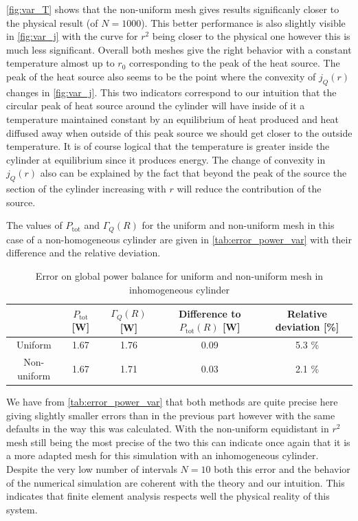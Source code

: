 \autoref{fig:var_T} shows that the non-uniform mesh gives results significanly closer to the physical result (of $N=1000$). This better performance is also slightly visible in \autoref{fig:var_j} with the curve for $r^2$ being closer to the physical one however this is much less significant. Overall both meshes give the right behavior with a constant temperature almost up to $r_0$ corresponding to the peak of the heat source. The peak of the heat source also seems to be the point where the convexity of $j_Q(r)$ changes in \autoref{fig:var_j}. This two indicators correspond to our intuition that the circular peak of heat source around the cylinder will have inside of it a temperature maintained constant by an equilibrium of heat produced and heat diffused away when outside of this peak source we should get closer to the outside temperature. It is of course logical that the temperature is greater inside the cylinder at equilibrium since it produces energy. The change of convexity in $j_Q(r)$ also can be explained by the fact that beyond the peak of the source the section of the cylinder increasing with $r$ will reduce the contribution of the source.

The values of $P_\mathrm{tot}$ and $\Gamma_Q(R)$ for the uniform and non-uniform mesh in this case of a non-homogeneous cylinder are given in \autoref{tab:error_power_var} with their difference and the relative deviation.
\begin{table}[H]
    \centering
    \begin{tabulary}{\linewidth}{C|C C C C}
        \toprule
        & \(P_\textrm{tot}\) [\si{\watt}] & \(\Gamma_Q(R)\) [\si{\watt}] & Difference to \(P_\textrm{tot}(R)\) [\si{\watt}] & Relative deviation [\%] \\
        \midrule
        Uniform & 1.67 & 1.76 & 0.09 & 5.3 \% \\
        Non-uniform & 1.67 & 1.71 & 0.03 & 2.1 \% \\
        \bottomrule
    \end{tabulary}
    \caption{Error on global power balance for uniform and non-uniform mesh in inhomogeneous cylinder}
    \label{tab:error_power_var}
\end{table}

We have from \autoref{tab:error_power_var} that both methods are quite precise here giving slightly smaller errors than in the previous part however with the same defaults in the way this was calculated. With the non-uniform equidistant in $r^2$ mesh still being the most precise of the two this can indicate once again that it is a more adapted mesh for this simulation with an inhomogeneous cylinder. Despite the very low number of intervals $N=10$ both this error and the behavior of the numerical simulation are coherent with the theory and our intuition. This indicates that finite element analysis respects well the physical reality of this system.


